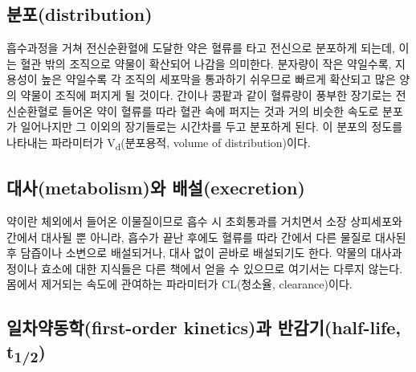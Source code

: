 \documentclass[
  11pt,
  krantz2, a4paper, twoside]{krantz}
\theoremstyle{definition}
\theoremstyle{definition}
\theoremstyle{definition}
\theoremstyle{definition}
\theoremstyle{remark}
\begin{document}
\hypertarget{uxbd84uxd3ecdistribution}{%
\subsection{분포(distribution)}\label{uxbd84uxd3ecdistribution}}

흡수과정을 거쳐 전신순환혈에 도달한 약은 혈류를 타고 전신으로 분포하게
되는데, 이는 혈관 밖의 조직으로 약물이 확산되어 나감을 의미한다.
분자량이 작은 약일수록, 지용성이 높은 약일수록 각 조직의 세포막을
통과하기 쉬우므로 빠르게 확산되고 많은 양의 약물이 조직에 퍼지게 될
것이다. 간이나 콩팥과 같이 혈류량이 풍부한 장기로는 전신순환혈로 들어온
약이 혈류를 따라 혈관 속에 퍼지는 것과 거의 비슷한 속도로 분포가
일어나지만 그 이외의 장기들로는 시간차를 두고 분포하게 된다. 이 분포의
정도를 나타내는 파라미터가 V\textsubscript{d}(분포용적, volume of distribution)이다.

\hypertarget{uxb300uxc0acmetabolismuxc640-uxbc30uxc124execretion}{%
\subsection{대사(metabolism)와 배설(execretion)}\label{uxb300uxc0acmetabolismuxc640-uxbc30uxc124execretion}}

약이란 체외에서 들어온 이물질이므로 흡수 시 초회통과를 거치면서
소장 상피세포와 간에서 대사될 뿐 아니라, 흡수가 끝난 후에도 혈류를 따라
간에서 다른 물질로 대사된 후 담즙이나 소변으로 배설되거나, 대사 없이
곧바로 배설되기도 한다. 약물의 대사과정이나 효소에 대한 지식들은 다른
책에서 얻을 수 있으므로 여기서는 다루지 않는다. 몸에서 제거되는 속도에
관여하는 파라미터가 CL(청소율, clearance)이다.

\hypertarget{uxc77cuxcc28uxc57duxb3d9uxd559first-order-kineticsuxacfc-uxbc18uxac10uxae30half-life-t12}{%
\subsection{\texorpdfstring{일차약동학(first-order kinetics)과 반감기(half-life, t\textsubscript{1/2})}{일차약동학(first-order kinetics)과 반감기(half-life, t1/2)}}\label{uxc77cuxcc28uxc57duxb3d9uxd559first-order-kineticsuxacfc-uxbc18uxac10uxae30half-life-t12}}

\end{document}
